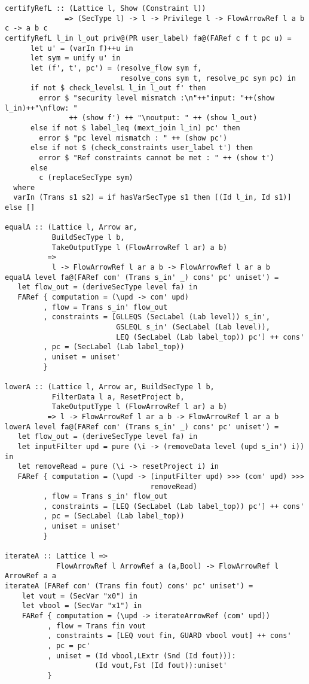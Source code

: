 \begin{Verbatim}[fontsize=\footnotesize,frame=lines,
                 framesep=5mm, label={[FlowArrowRef.hs]FlowArrowRef.hs}]
certifyRefL :: (Lattice l, Show (Constraint l)) 
              => (SecType l) -> l -> Privilege l -> FlowArrowRef l a b c -> a b c
certifyRefL l_in l_out priv@(PR user_label) fa@(FARef c f t pc u) =
      let u' = (varIn f)++u in
      let sym = unify u' in
      let (f', t', pc') = (resolve_flow sym f, 
                           resolve_cons sym t, resolve_pc sym pc) in
      if not $ check_levelsL l_in l_out f' then
        error $ "security level mismatch :\n"++"input: "++(show l_in)++"\nflow: " 
               ++ (show f') ++ "\noutput: " ++ (show l_out)
      else if not $ label_leq (mext_join l_in) pc' then
        error $ "pc level mismatch : " ++ (show pc') 
      else if not $ (check_constraints user_label t') then
        error $ "Ref constraints cannot be met : " ++ (show t')
      else
        c (replaceSecType sym)  
  where
  varIn (Trans s1 s2) = if hasVarSecType s1 then [(Id l_in, Id s1)] else [] 

equalA :: (Lattice l, Arrow ar,
           BuildSecType l b, 
           TakeOutputType l (FlowArrowRef l ar) a b)
          =>
           l -> FlowArrowRef l ar a b -> FlowArrowRef l ar a b
equalA level fa@(FARef com' (Trans s_in' _) cons' pc' uniset') =
   let flow_out = (deriveSecType level fa) in
   FARef { computation = (\upd -> com' upd)
         , flow = Trans s_in' flow_out
         , constraints = [GLLEQS (SecLabel (Lab level)) s_in', 
                          GSLEQL s_in' (SecLabel (Lab level)), 
                          LEQ (SecLabel (Lab label_top)) pc'] ++ cons'
         , pc = (SecLabel (Lab label_top))
         , uniset = uniset'
         }

lowerA :: (Lattice l, Arrow ar, BuildSecType l b,
           FilterData l a, ResetProject b,
           TakeOutputType l (FlowArrowRef l ar) a b) 
          => l -> FlowArrowRef l ar a b -> FlowArrowRef l ar a b
lowerA level fa@(FARef com' (Trans s_in' _) cons' pc' uniset') =
   let flow_out = (deriveSecType level fa) in
   let inputFilter upd = pure (\i -> (removeData level (upd s_in') i)) in
   let removeRead = pure (\i -> resetProject i) in
   FARef { computation = (\upd -> (inputFilter upd) >>> (com' upd) >>> 
                                  removeRead)
         , flow = Trans s_in' flow_out
         , constraints = [LEQ (SecLabel (Lab label_top)) pc'] ++ cons' 
         , pc = (SecLabel (Lab label_top))
         , uniset = uniset'
         }

iterateA :: Lattice l => 
            FlowArrowRef l ArrowRef a (a,Bool) -> FlowArrowRef l ArrowRef a a
iterateA (FARef com' (Trans fin fout) cons' pc' uniset') =
    let vout = (SecVar "x0") in
    let vbool = (SecVar "x1") in
    FARef { computation = (\upd -> iterateArrowRef (com' upd))
          , flow = Trans fin vout
          , constraints = [LEQ vout fin, GUARD vbool vout] ++ cons'
          , pc = pc'
          , uniset = (Id vbool,LExtr (Snd (Id fout))):
                     (Id vout,Fst (Id fout)):uniset'
          }


\end{Verbatim}
